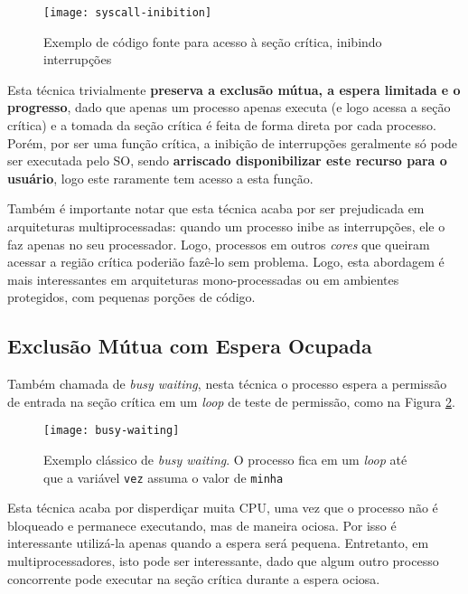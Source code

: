 \begin{figure}[ht]
  \centering
  \texttt{[image: syscall-inibition]}
  \caption{Exemplo de código fonte para acesso à seção crítica, inibindo interrupções}
  \label{fig:syscall-inibition}
\end{figure}

Esta técnica trivialmente \textbf{preserva a exclusão mútua, a espera limitada e o progresso}, dado que apenas um processo apenas executa (e logo acessa a seção crítica) e a tomada da seção crítica é feita de forma direta por cada processo. Porém, por ser uma função crítica, a inibição de interrupções geralmente só pode ser executada pelo SO, sendo \textbf{arriscado disponibilizar este recurso para o usuário}, logo este raramente tem acesso a esta função.

Também é importante notar que esta técnica acaba por ser prejudicada em arquiteturas multiprocessadas: quando um processo inibe as interrupções, ele o faz apenas no seu processador. Logo, processos em outros \textit{cores} que queiram acessar a região crítica poderião fazê-lo sem problema. Logo, esta abordagem é mais interessantes em arquiteturas mono-processadas ou em ambientes protegidos, com pequenas porções de código.





\subsection{Exclusão Mútua com Espera Ocupada}
Também chamada de \textit{busy waiting}, nesta técnica o processo espera a permissão de entrada na seção crítica em um \textit{loop} de teste de permissão, como na Figura \ref{fig:busy-waiting}.

\begin{figure}[ht]
  \centering
  \texttt{[image: busy-waiting]}
  \caption{Exemplo clássico de \textit{busy waiting}. O processo fica em um \textit{loop} até que a variável \texttt{vez} assuma o valor de \texttt{minha}}
  \label{fig:busy-waiting}
\end{figure}

Esta técnica acaba por disperdiçar muita CPU, uma vez que o processo não é bloqueado e permanece executando, mas de maneira ociosa. Por isso é interessante utilizá-la apenas quando a espera será pequena. Entretanto, em multiprocessadores, isto pode ser interessante, dado que algum outro processo concorrente pode executar na seção crítica durante a espera ociosa.

